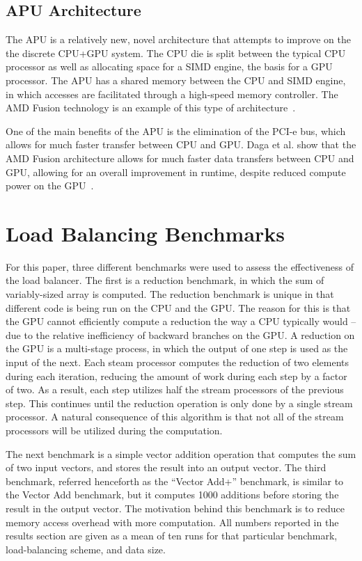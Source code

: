 \documentclass[journal]{IEEEtran}
\begin{document}
\subsection{APU Architecture}
The APU is a relatively new, novel architecture that attempts to 
improve on the the discrete CPU+GPU system.  The CPU die is split
between the typical CPU processor as well as allocating space
for a SIMD engine, the basis for a GPU processor.  The APU has a 
shared memory between the CPU and SIMD engine, in which accesses
are facilitated through a high-speed memory controller.  The AMD
Fusion technology is an example of this type of architecture~\cite{AMDFusion}.

One of the main benefits of the APU is the elimination of the PCI-e
bus, which allows for much faster transfer between CPU and GPU.  Daga et al.
show that the AMD Fusion architecture allows for much faster data transfers
between CPU and GPU, allowing for an overall improvement in runtime, despite
reduced compute power on the GPU~\cite{Daga2011}. 

\section{Load Balancing Benchmarks}
For this paper, three different benchmarks were used to assess the
effectiveness of the load balancer.  The first is a reduction benchmark,
in which the sum of variably-sized array is computed.  The reduction benchmark
is unique in that different code is being run on the CPU and the GPU.  The
reason for this is that the GPU cannot efficiently compute a reduction the way
a CPU typically would -- due to the relative inefficiency of backward branches
on the GPU.  A reduction on the GPU is a multi-stage process, in which the
output of one step is used as the input of the next.  Each steam processor
computes the reduction of two elements during each iteration, reducing the amount
of work during each step by a factor of two.  As a result, each step utilizes half
the stream processors of the previous step.  This continues until the reduction
operation is only done by a single stream processor.  A natural consequence of
this algorithm is that not all of the stream processors will be utilized during
the computation.

The next benchmark is a simple vector addition operation that computes the sum
of two input vectors, and stores the result into an output vector.  The third
benchmark, referred henceforth as the ``Vector Add+'' benchmark, is similar to
the Vector Add benchmark, but it computes 1000 additions before storing the result
in the output vector.  The motivation behind this benchmark is to reduce memory
access overhead with more computation.  All numbers reported in the results section
are given as a mean of ten runs for that particular benchmark, load-balancing scheme,
and data size.
\end{document}
